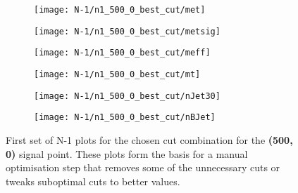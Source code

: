 \begin{figure}
	\centering
	\begin{subfigure}[b]{0.5\linewidth}
		\centering\texttt{[image: N-1/n1\_500\_0\_best\_cut/met]}
		\caption{\label{fig:result_500_0_met}}
	\end{subfigure}%
	\begin{subfigure}[b]{0.5\linewidth}
		\centering\texttt{[image: N-1/n1\_500\_0\_best\_cut/metsig]}
		\caption{\label{fig:result_500_0_metsig}}
	\end{subfigure}
	\begin{subfigure}[b]{0.5\linewidth}
		\centering\texttt{[image: N-1/n1\_500\_0\_best\_cut/meff]}
		\caption{\label{fig:result_500_0_meff}}
	\end{subfigure}%
	\begin{subfigure}[b]{0.5\linewidth}
		\centering\texttt{[image: N-1/n1\_500\_0\_best\_cut/mt]}
		\caption{\label{fig:result_500_0_mt}}
	\end{subfigure}
	\begin{subfigure}[b]{0.5\linewidth}
		\centering\texttt{[image: N-1/n1\_500\_0\_best\_cut/nJet30]}
		\caption{\label{fig:result_500_0_njet}}
	\end{subfigure}%
	\begin{subfigure}[b]{0.5\linewidth}
		\centering\texttt{[image: N-1/n1\_500\_0\_best\_cut/nBJet]}
		\caption{\label{fig:result_500_0_nbjet}}
	\end{subfigure}
	\caption[N-1 plots for the chosen cut combination for the (500,0) signal point, 1/2]{First set of N-1 plots for the chosen cut combination for the \textbf{(500, 0)} signal point. These plots form the basis for a manual optimisation step that removes some of the unnecessary cuts or tweaks suboptimal cuts to better values.}
	\label{fig:results_500_0_n-1_1}
\end{figure}

